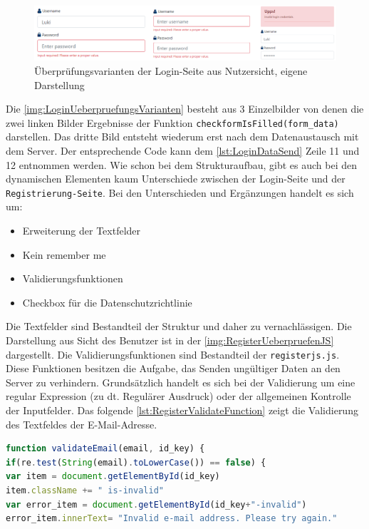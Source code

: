 \documentclass[a4paper,titlepage,halfparskip,12pt]{scrreprt}
\begin{document}
\begin{onehalfspacing}
\begin{figure}[h]
	\centering
	\includegraphics[width=\linewidth]{images/LoginUeberpruefungJSGesamt}
	\caption{Überprüfungsvarianten der Login-Seite aus Nutzersicht, eigene Darstellung}
	\label{img:LoginUeberpruefungsVarianten}
\end{figure}
Die \autoref{img:LoginUeberpruefungsVarianten} besteht aus 3 Einzelbilder von denen die zwei linken Bilder Ergebnisse der Funktion \texttt{checkformIsFilled(form\_data)} darstellen. Das dritte Bild entsteht wiederum erst nach dem Datenaustausch mit dem Server. Der entsprechende Code kann dem \autoref{lst:LoginDataSend} Zeile 11 und 12 entnommen werden. Wie schon bei dem Strukturaufbau, gibt es auch bei den dynamischen Elementen kaum Unterschiede zwischen der Login-Seite und der \texttt{Registrierung-Seite}.
Bei den Unterschieden und Ergänzungen handelt es sich um:
\begin{itemize}
	\item Erweiterung der Textfelder
	\item Kein \glqq remember me\grqq
	\item Validierungsfunktionen
	\item Checkbox für die Datenschutzrichtlinie
\end{itemize}
Die Textfelder sind Bestandteil der Struktur und daher zu vernachlässigen. Die Darstellung aus Sicht des Benutzer ist in der \autoref{img:RegisterUeberpruefenJS} dargestellt. Die Validierungsfunktionen sind Bestandteil der \texttt{registerjs.js}. Diese Funktionen besitzen die Aufgabe, das Senden ungültiger Daten an den Server zu verhindern. Grundsätzlich handelt es sich bei der Validierung um eine regular Expression (zu dt. Regulärer Ausdruck) oder der allgemeinen Kontrolle der Inputfelder. Das folgende \autoref{lst:RegisterValidateFunction} zeigt die Validierung des Textfeldes der E-Mail-Adresse.
\begin{lstlisting}[language=Javascript,caption=Validierungsfunktion \textit{validateEmail()},label={lst:RegisterValidateFunction}]
function validateEmail(email, id_key) {
if(re.test(String(email).toLowerCase()) == false) {
var item = document.getElementById(id_key)
item.className += " is-invalid"
var error_item = document.getElementById(id_key+"-invalid")
error_item.innerText= "Invalid e-mail address. Please try again."

\end{lstlisting}
\end{onehalfspacing}
\end{document}
